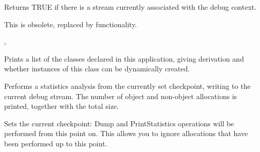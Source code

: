 \label{wxdebugcontexthasstream}


Returns TRUE if there is a stream currently associated
with the debug context.

This is obsolete, replaced by  functionality.


, 

\label{wxdebugcontextprintclasses}


Prints a list of the classes declared in this application, giving derivation
and whether instances of this class can be dynamically created.



\label{wxdebugcontextprintstatistics}


Performs a statistics analysis from the currently set checkpoint, writing
to the current debug stream. The number of object and non-object
allocations is printed, together with the total size.





\label{wxdebugcontextsetcheckpoint}


Sets the current checkpoint: Dump and PrintStatistics operations will
be performed from this point on. This allows you to ignore allocations
that have been performed up to this point.



